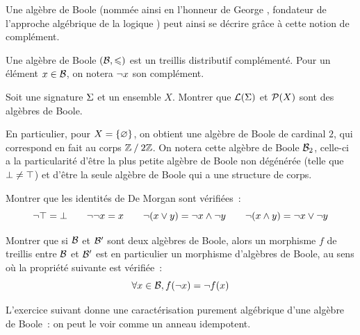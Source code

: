 Une algèbre de Boole (nommée ainsi en l'honneur de George ,
fondateur de l'approche algébrique de la logique \cite{Boole1854}) peut ainsi se
décrire grâce à cette notion de complément.

\begin{definition}
  Une algèbre de Boole $(\mathcal{B},\leqslant)$ est un treillis distributif
  complémenté. Pour un élément $x\in \mathcal{B}$, on notera $\lnot x$ son
  complément.
\end{definition}

\begin{exercise}
  Soit une signature $\Sigma$ et un ensemble $X$. Montrer que
  $\mathcal{L}(\Sigma)$ et $\mathcal{P}(X)$ sont des algèbres de Boole.
\end{exercise}

\begin{remark}
  En particulier, pour $X = \{\varnothing\}$, on obtient une algèbre de Boole
  de cardinal $2$, qui correspond en fait au corps $\mathord{\mathbb Z}\mathbin{/}\mathord{2\mathbb Z}$.
  On notera cette algèbre de Boole $\mathcal{B}_2$, celle-ci a la
  particularité d'être la plus petite algèbre de Boole non dégénérée
  (telle que $\bot \neq \top$) et d'être la seule algèbre de Boole qui a
  une structure de corps.
\end{remark}

\begin{exercise}
  Montrer que les identités de De Morgan sont vérifiées~:
  \[\lnot \top = \bot \qquad \lnot\lnot x = x
  \qquad \lnot (x \vee y) = \lnot x \wedge \lnot y
  \qquad \lnot (x \wedge y) = \lnot x \vee \lnot y\]
\end{exercise}

\begin{exercise}
  Montrer que si $\mathcal{B}$ et $\mathcal{B}'$ sont deux algèbres de Boole, alors
  un morphisme $f$ de treillis entre $\mathcal{B}$ et $\mathcal{B}'$ est en particulier un
  morphisme d'algèbres de Boole, au sens où la propriété suivante est
  vérifiée~:
  \[\forall x \in \mathcal{B}, f(\lnot x) = \lnot f(x)\]
\end{exercise}

L'exercice suivant donne une caractérisation purement algébrique d'une algèbre
de Boole~: on peut le voir comme un anneau idempotent.

